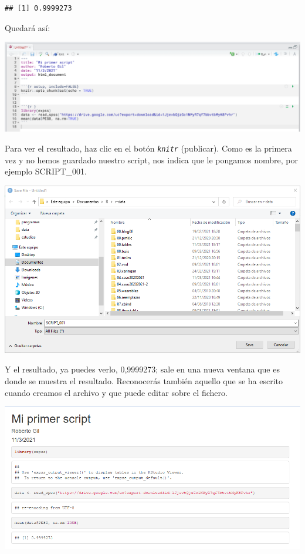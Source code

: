 \documentclass[
]{book}
\begin{document}
\begin{verbatim}
## [1] 0.9999273
\end{verbatim}

Quedará así:

\includegraphics{data/RS10.png}

Para ver el resultado, haz clic en el botón \emph{\texttt{knitr}} (publicar). Como es la primera vez y no hemos guardado nuestro script, nos indica que le pongamos nombre, por ejemplo SCRIPT\_001.

\includegraphics{data/RS11.png}

Y el resultado, ya puedes verlo, 0,9999273; sale en una nueva ventana que es donde se muestra el resultado. Reconocerás también aquello que se ha escrito cuando creamos el archivo y que puede editar sobre el fichero.

\includegraphics{data/RS12.png}
\end{document}
